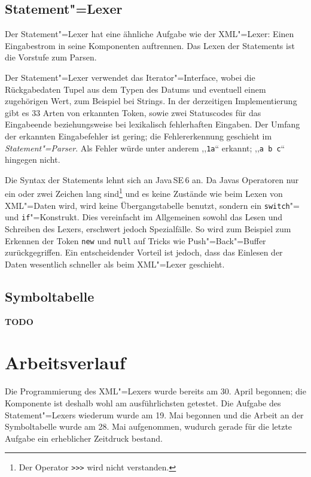 \documentclass[10pt,a4paper,ngerman,titlepage,tocindentauto]{scrartcl}
\newcommand{\TODO}{ {\LARGE\bf\color{crimson} TODO} }
\begin{document}
		\subsection{Statement"=Lexer}
			Der Statement"=Lexer hat eine ähnliche Aufgabe wie der XML"=Lexer: Einen Eingabestrom in seine
			Komponenten auftrennen. Das Lexen der Statements ist die Vorstufe zum Parsen.
			
			Der Statement"=Lexer verwendet das Iterator"=Interface, wobei die Rückgabedaten
			Tupel aus dem Typen des Datums und eventuell einem zugehörigen Wert, zum Beispiel bei Strings.
			In der derzeitigen Implementierung gibt es 33 Arten von erkannten Token, sowie zwei
			Statuscodes für das Eingabeende beziehungsweise bei lexikalisch fehlerhaften Eingaben.
			Der Umfang der erkannten Eingabefehler ist gering; die Fehlererkennung geschieht im
			{\em Statement"=Parser}. Als Fehler würde unter anderem ,,\verb|1a|`` erkannt; ,,\verb|a b c|`` hingegen nicht.
			
			Die Syntax der Statements lehnt sich an Java\,SE\,6 an. Da Javas Operatoren nur ein oder
			zwei Zeichen lang sind\footnote{Der Operator \texttt{{>}>{>}} wird nicht verstanden.} und es keine Zustände wie beim
			Lexen von XML"=Daten wird, wird keine Übergangstabelle benutzt, sondern ein \verb|switch|"= und
			\verb|if|"=Konstrukt. Dies vereinfacht im Allgemeinen sowohl das Lesen und Schreiben des Lexers,
			erschwert jedoch Spezialfälle. So wird zum Beispiel zum Erkennen der Token \verb|new| und
			\verb|null| auf Tricks wie Push"=Back"=Buffer zurückgegriffen.
			Ein entscheidender Vorteil ist jedoch, dass das Einlesen der Daten wesentlich schneller
			als beim XML"=Lexer geschieht.
	
		\subsection{Symboltabelle}
			\TODO
	
	\section[Arbeitsverlauf]{\hypertarget{Arbeitsverlauf}{Arbeitsverlauf}}
		Die Programmierung des XML"=Lexers wurde bereits am 30. April begonnen; die Komponente ist deshalb
		wohl am ausführlichsten getestet. Die Aufgabe des Statement"=Lexers wiederum wurde
		am 19. Mai begonnen und die Arbeit an der Symboltabelle wurde am 28. Mai aufgenommen,
		wudurch gerade für die letzte Aufgabe ein erheblicher Zeitdruck bestand.
		
\end{document}
